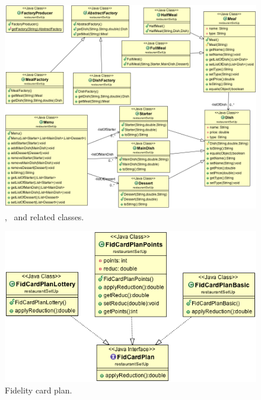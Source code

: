 \begin{figure}
  \begin{center}
    \includegraphics[scale=0.5]{./img/DishAndMeal.png}
    \end{center}
  \caption{\umld \Dish, \Meal~and related classes.}
  \label{fig:dish_meal_uml}
\end{figure}
\begin{figure}
  \begin{center}
    \includegraphics[scale=0.5]{./img/FidCardPlan.png}
    \end{center}
  \caption{\umld Fidelity card plan.}
  \label{fig:fidcardplan_uml}
\end{figure}
